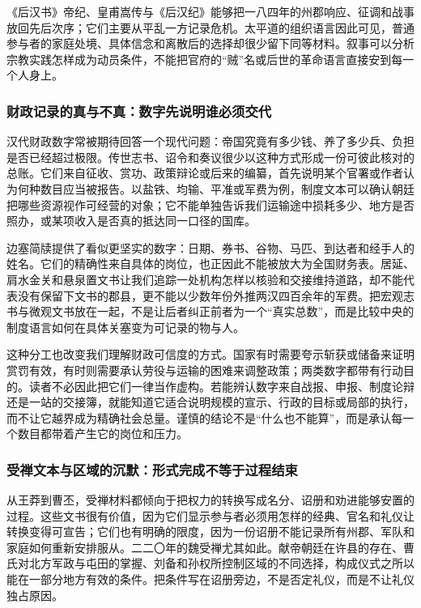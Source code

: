 \begin{debate}[黄巾材料为何不能替参与者说话]
《后汉书》帝纪、皇甫嵩传与《后汉纪》能够把一八四年的州郡响应、征调和战事放回先后次序；它们主要从平乱一方记录危机。太平道的组织语言因此可见，普通参与者的家庭处境、具体信念和离散后的选择却很少留下同等材料。叙事可以分析宗教实践怎样成为动员条件，不能把官府的“贼”名或后世的革命语言直接安到每一个人身上。
\end{debate}

\subsubsection{财政记录的真与不真：数字先说明谁必须交代}

汉代财政数字常被期待回答一个现代问题：帝国究竟有多少钱、养了多少兵、负担是否已经超过极限。传世志书、诏令和奏议很少以这种方式形成一份可彼此核对的总账。它们来自征收、赏功、政策辩论或后来的编纂，首先说明某个官署或作者认为何种数目应当被报告。以盐铁、均输、平准或军费为例，制度文本可以确认朝廷把哪些资源视作可经营的对象；它不能单独告诉我们运输途中损耗多少、地方是否照办，或某项收入是否真的抵达同一口径的国库。

边塞简牍提供了看似更坚实的数字：日期、券书、谷物、马匹、到达者和经手人的姓名。它们的精确性来自具体的岗位，也正因此不能被放大为全国财务表。居延、肩水金关和悬泉置文书让我们追踪一处机构怎样以核验和交接维持道路，却不能代表没有保留下文书的郡县，更不能以少数年份外推两汉四百余年的军费。把宏观志书与微观文书放在一起，不是让后者纠正前者为一个“真实总数”，而是比较中央的制度语言如何在具体关塞变为可记录的物与人。

这种分工也改变我们理解财政可信度的方式。国家有时需要夸示斩获或储备来证明赏罚有效，有时则需要承认劳役与运输的困难来调整政策；两类数字都带有行动目的。读者不必因此把它们一律当作虚构。若能辨认数字来自战报、申报、制度论辩还是一站的交接簿，就能知道它适合说明规模的宣示、行政的目标或局部的执行，而不让它越界成为精确社会总量。谨慎的结论不是“什么也不能算”，而是承认每一个数目都带着产生它的岗位和压力。

\subsubsection{受禅文本与区域的沉默：形式完成不等于过程结束}

从王莽到曹丕，受禅材料都倾向于把权力的转换写成名分、诏册和劝进能够安置的过程。这些文书很有价值，因为它们显示参与者必须用怎样的经典、官名和礼仪让转换变得可宣告；它们也有明确的限度，因为一份诏册不能记录所有州郡、军队和家庭如何重新安排服从。二二〇年的魏受禅尤其如此。献帝朝廷在许县的存在、曹氏对北方军政与屯田的掌握、刘备和孙权所控制区域的不同选择，构成仪式之所以能在一部分地方有效的条件。把条件写在诏册旁边，不是否定礼仪，而是不让礼仪独占原因。

